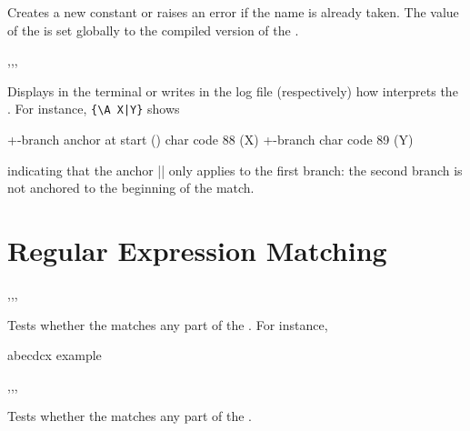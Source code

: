 \documentclass[oneside]{book}
\begin{document}
\begin{function}{\RegexConst}
\begin{syntax}
  
\end{syntax}
Creates a new constant  or raises an error if the name
is already taken.  The value of the  is set
globally to the compiled version of the .
\end{function}

\begin{function}{\RegexLog,\RegexVarLog,\RegexShow,\RegexVarShow}
\begin{syntax}
 
 
 
 
\end{syntax}
Displays in the terminal or writes in the log file (respectively)
how  interprets the . For instance,
 \verb+{\A X|Y}+ shows
\begin{codehigh}
+-branch
  anchor at start (\A)
  char code 88 (X)
+-branch
  char code 89 (Y)
\end{codehigh}
indicating that the anchor |\A| only applies to the first branch:
the second branch is not anchored to the beginning of the match.
\end{function}

\section{Regular Expression Matching}

\begin{function}{\RegexMatch,\RegexMatchT,\RegexMatchF,\RegexMatchTF}
\begin{syntax}
  
   
   
    
\end{syntax}
Tests whether the  matches any part
of the . For instance,
\begin{demohigh}
 {abecdcx} {} {}
\RegexMatchTF {[b-dq-w]} {example} {} {}
\end{demohigh}
\end{function}

\begin{function}{\RegexVarMatch,\RegexVarMatchT,\RegexVarMatchF,\RegexVarMatchTF}
\begin{syntax}
  
   
   
    
\end{syntax}
Tests whether the  matches any part of the .
\end{function}
\end{document}
